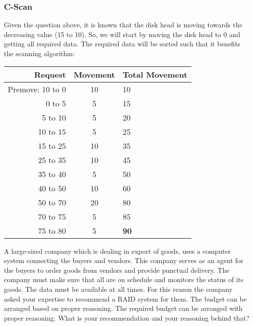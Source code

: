\documentclass[
  11pt, %
]{assignment}
\begin{document}
\subsubsection*{C-Scan}

Given the question above, it is known that the disk head is moving towards the decreasing value (15 to 10). So, we will start by moving the disk head to 0 and getting all required data. The required data will be sorted such that it benefits the scanning algorithm:

\begin{center}
	\begin{tabular}[pos]{r c l}
		\toprule
		\textbf{Request} & \textbf{Movement} & \textbf{Total Movement} \\
		\midrule
		Premove: 10 to 0 & 10                & 10                      \\
		\midrule
		0 to 5           & 5                 & 15                      \\
		5 to 10          & 5                 & 20                      \\
		10 to 15         & 5                 & 25                      \\
		15 to 25         & 10                & 35                      \\
		25 to 35         & 10                & 45                      \\
		35 to 40         & 5                 & 50                      \\
		40 to 50         & 10                & 60                      \\
		50 to 70         & 20                & 80                      \\
		70 to 75         & 5                 & 85                      \\
		75 to 80         & 5                 & \textbf{90}             \\
	\end{tabular}
\end{center}

\begin{problem}
A large-sized company which is dealing in export of goods, uses a computer system connecting the buyers and vendors. This company serves as an agent for the buyers to order goods from vendors and provide punctual delivery. The company must make sure that all are on schedule and monitors the status of its goods. The data must be available at all times. For this reason the company asked your expertise to recommend a RAID system for them. The budget can be arranged based on proper reasoning. The required budget can be arranged with proper reasoning. What is your recommendation and your reasoning behind that?
\end{problem}
\end{document}
